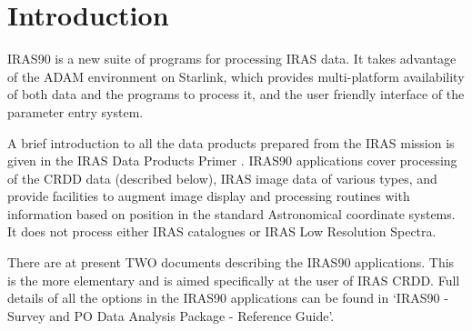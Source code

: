 \stardocabstract
 \newpage
 \begin{latexonly}
   \setlength{\parskip}{0mm}
   \latexonlytoc
   \setlength{\parskip}{\medskipamount}
   \markright{\stardocname}
 \end{latexonly}
\newpage
\renewcommand{\thepage}{\arabic{page}}
\setcounter{page}{1}

\section{Introduction
\label{m:intro}}

IRAS90 is a new suite of programs for processing IRAS data. It takes advantage
of the ADAM environment on Starlink, which provides multi-platform availability
of both data and the programs to process it, and the user friendly interface of
the parameter entry system.

A brief introduction to all the data products prepared from the IRAS mission
is given in the IRAS Data Products Primer
. IRAS90 applications cover
processing of the CRDD data (described below), IRAS image data of various types,
and provide facilities to augment image display and processing routines with
information based on position in the standard Astronomical coordinate systems.
It does not process either IRAS catalogues or IRAS Low Resolution Spectra.

There are at present TWO documents describing the IRAS90 applications. This is
the more elementary and is aimed specifically at the user of IRAS CRDD. Full
details of all the options in the IRAS90 applications can be found in
`IRAS90 - Survey and PO Data Analysis Package - Reference Guide'.


